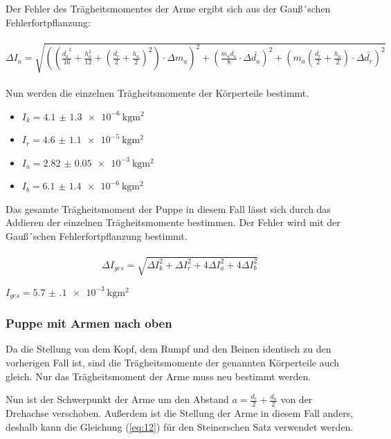 Der Fehler des Trägheitsmomentes der Arme ergibt sich aus der Gauß´schen
Fehlerfortpflanzung: \\\\

$\Delta I_a = \sqrt{\left(\left(\frac{\bar{d_a}^2}{16} + \frac{h_a^2}{12} +
\left(\frac{\bar{d_r}}{2} + \frac{h_a}{2}\right)^2\right) \cdot \Delta m_a \right)^2
  + \left( \frac{m_a\bar{d_a}}{8} \cdot \Delta \bar{d_a} \right)^2
  + \left( m_a \left(\frac{\bar{d_r}}{2} + \frac{h_a}{2}\right) \cdot \Delta \bar{d_r} \right)^2}$\\\\

Nun werden die einzelnen Trägheitsmomente der Körperteile bestimmt.

\begin{itemize}
  \item $I_k = \SI{4.1(13)e-6}{\kilo\gram\meter\squared}$
  \item $I_r = \SI{4.6(11)e-5}{\kilo\gram\meter\squared}$
  \item $I_a = \SI{2.82(5)e-3}{\kilo\gram\meter\squared}$
  \item $I_b = \SI{6.1(14)e-6}{\kilo\gram\meter\squared}$
\end{itemize}

Das gesamte Trägheitsmoment der Puppe in diesem Fall lässt sich durch das Addieren
der einzelnen Trägheitsmomente bestimmen. Der Fehler wird mit der Gauß´schen Fehlerfortpflanzung
bestimmt. \\\\

\begin{equation}
\Delta I_{ges} = \sqrt{\Delta I_k^2 + \Delta I_r^2 + 4\Delta I_a^2 + 4\Delta I_b^2}
\label{eq:14}
\end{equation}

\centerline{$I_{ges} = \SI{5.7(1)e-3}{\kilo\gram\meter\squared}$}

\subsubsection{Puppe mit Armen nach oben}

Da die Stellung von dem Kopf, dem Rumpf und den Beinen identisch zu den vorherigen
Fall ist, sind die Trägheitsmomente der genannten Körperteile auch gleich.
Nur das Trägheitsmoment der Arme muss neu bestimmt werden.

Nun ist der Schwerpunkt der Arme um den Abstand $a = \frac{d_r}{2} + \frac{d_a}{2}$
von der Drehachse verschoben. Außerdem ist die Stellung der Arme in diesem Fall anders,
deshalb kann die Gleichung (\ref{eq:12}) für den Steinerschen Satz verwendet werden.\\\\

